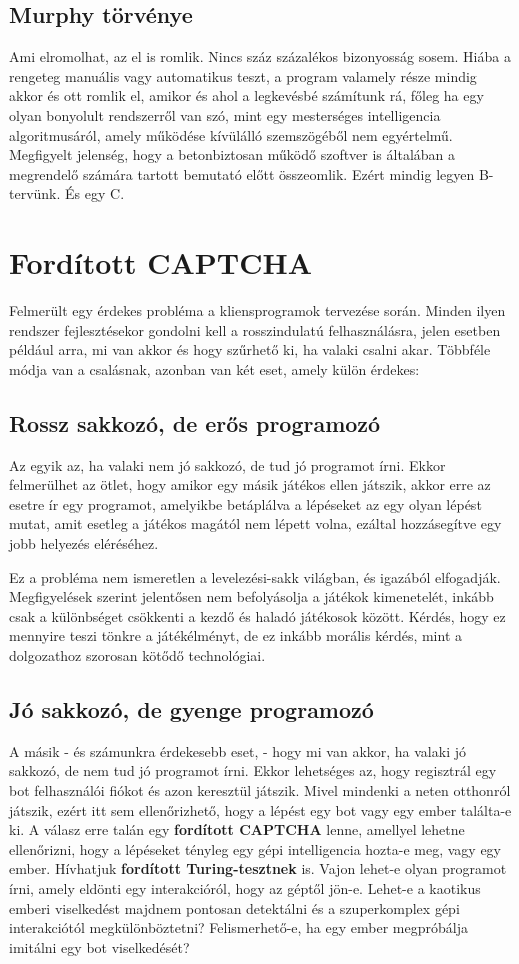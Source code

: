 \documentclass[twoside, a4paper, 12pt]{book}
\begin{document}
\subsection*{Murphy törvénye}
Ami elromolhat, az el is romlik. Nincs száz százalékos bizonyosság sosem. Hiába a rengeteg manuális vagy automatikus teszt, a program valamely része mindig akkor és ott romlik el, amikor és ahol a legkevésbé számítunk rá, főleg ha egy olyan bonyolult rendszerről van szó, mint egy mesterséges intelligencia algoritmusáról, amely működése kívülálló szemszögéből nem egyértelmű. Megfigyelt jelenség, hogy a betonbiztosan működő szoftver is általában a megrendelő számára tartott bemutató előtt összeomlik. Ezért mindig legyen B-tervünk. És egy C.

\section{Fordított CAPTCHA}
Felmerült egy érdekes probléma a kliensprogramok tervezése során. Minden ilyen rendszer fejlesztésekor gondolni kell a rosszindulatú felhasználásra, jelen esetben például arra, mi van akkor és hogy szűrhető ki, ha valaki csalni akar. Többféle módja van a csalásnak, azonban van két eset, amely külön érdekes:
\subsection*{Rossz sakkozó, de erős programozó}
Az egyik az, ha valaki nem jó sakkozó, de tud jó programot írni. Ekkor felmerülhet az ötlet, hogy amikor egy másik játékos ellen játszik, akkor erre az esetre ír egy programot, amelyikbe betáplálva a lépéseket az egy olyan lépést mutat, amit esetleg a játékos magától nem lépett volna, ezáltal hozzásegítve egy jobb helyezés eléréséhez.

Ez a probléma nem ismeretlen a levelezési-sakk világban, és igazából elfogadják. Megfigyelések szerint jelentősen nem befolyásolja a játékok kimenetelét, inkább csak a különbséget csökkenti a kezdő és haladó játékosok között. \cite{corrChessHelpHu} Kérdés, hogy ez mennyire teszi tönkre a játékélményt, de ez inkább morális kérdés, mint a dolgozathoz szorosan kötődő technológiai.

\subsection*{Jó sakkozó, de gyenge programozó}A másik - és számunkra érdekesebb eset, - hogy mi van akkor, ha valaki jó sakkozó, de nem tud jó programot írni. Ekkor lehetséges az, hogy regisztrál egy bot felhasználói fiókot és azon keresztül játszik. Mivel mindenki a neten otthonról játszik, ezért itt sem ellenőrizhető, hogy a lépést egy bot vagy egy ember találta-e ki. A válasz erre talán egy \textbf{fordított CAPTCHA} lenne, amellyel lehetne ellenőrizni, hogy a lépéseket tényleg egy gépi intelligencia hozta-e meg, vagy egy ember. Hívhatjuk \textbf{fordított Turing-tesztnek} is. Vajon lehet-e olyan programot írni, amely eldönti egy interakcióról, hogy az géptől jön-e. Lehet-e a kaotikus emberi viselkedést majdnem pontosan detektálni és a szuperkomplex gépi interakciótól megkülönböztetni? Felismerhető-e, ha egy ember megpróbálja imitálni egy bot viselkedését?
\end{document}
